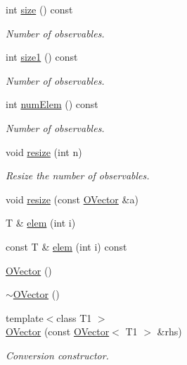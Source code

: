 \begin{DoxyCompactItemize}
int \mbox{\hyperlink{classENSEM_1_1OVector_a715979c319905eb60532815bb3c77aab}{size}} () const
\begin{DoxyCompactList}\small\item\em Number of observables. \end{DoxyCompactList}\item 
int \mbox{\hyperlink{classENSEM_1_1OVector_af2035852c6cefe80834b8e2a17648113}{size1}} () const
\begin{DoxyCompactList}\small\item\em Number of observables. \end{DoxyCompactList}\item 
int \mbox{\hyperlink{classENSEM_1_1OVector_a77771968912766dab2f1bd6ed7ccc876}{num\+Elem}} () const
\begin{DoxyCompactList}\small\item\em Number of observables. \end{DoxyCompactList}\item 
void \mbox{\hyperlink{classENSEM_1_1OVector_a2758b982bf7fa25b69d31fe8d7f72762}{resize}} (int n)
\begin{DoxyCompactList}\small\item\em Resize the number of observables. \end{DoxyCompactList}\item 
void \mbox{\hyperlink{classENSEM_1_1OVector_a64fa4ad4d58dd32268c2bea8be1de212}{resize}} (const \mbox{\hyperlink{classENSEM_1_1OVector}{O\+Vector}} \&a)
\item 
T \& \mbox{\hyperlink{classENSEM_1_1OVector_a8d84b5c1145d0647107413d254450417}{elem}} (int i)
\item 
const T \& \mbox{\hyperlink{classENSEM_1_1OVector_afddf0b325b50484d1c8f0ab8f0abd3c8}{elem}} (int i) const
\item 
\mbox{\hyperlink{classENSEM_1_1OVector_a49c6719652aea7b411f9ce1e5aa38b18}{O\+Vector}} ()
\item 
\mbox{\hyperlink{classENSEM_1_1OVector_adce03257e8042e3ba68c15f88148a83a}{$\sim$\+O\+Vector}} ()
\item 
{\footnotesize template$<$class T1 $>$ }\\\mbox{\hyperlink{classENSEM_1_1OVector_a1d68ef86b31297a79368789f7a0e43bc}{O\+Vector}} (const \mbox{\hyperlink{classENSEM_1_1OVector}{O\+Vector}}$<$ T1 $>$ \&rhs)
\begin{DoxyCompactList}\small\item\em Conversion constructor. \end{DoxyCompactList}\item 

\end{DoxyCompactItemize}
